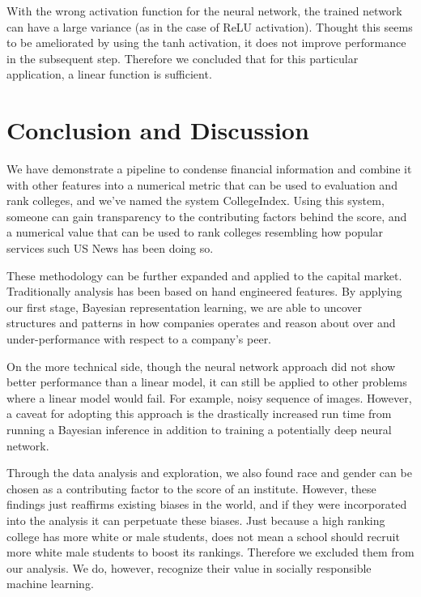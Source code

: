\documentclass[11pt,letter]{article}
\begin{document}
With the wrong activation function for the neural network, the trained network can have a large variance (as in the case of ReLU activation). Thought this seems to be ameliorated by using the tanh activation, it does not improve performance in the subsequent step. Therefore we concluded that for this particular application, a linear function is sufficient. 

\section{Conclusion and Discussion}
We have demonstrate a pipeline to condense financial information and combine it with other features into a numerical metric that can be used to evaluation and rank colleges, and we've named the system CollegeIndex. Using this system, someone can gain transparency to the contributing factors behind the score, and a numerical value that can be used to rank colleges resembling how popular services such US News has been doing so. 

These methodology can be further expanded and applied to the capital market. Traditionally analysis has been based on hand engineered features. By applying our first stage, Bayesian representation learning, we are able to uncover structures and patterns in how companies operates and reason about over and under-performance with respect to a company's peer. 

On the more technical side, though the neural network approach did not show better performance than a linear model, it can still be applied to other problems where a linear model would fail. For example, noisy sequence of images. However, a caveat for adopting this approach is the drastically increased run time from running a Bayesian inference in addition to training a potentially deep neural network. 

Through the data analysis and exploration, we also found race and gender can be chosen as a contributing factor to the score of an institute. However, these findings just reaffirms existing biases in the world, and if they were incorporated into the analysis it can perpetuate these biases. Just because a high ranking college has more white or male students, does not mean a school should recruit more white male students to boost its rankings. Therefore we excluded them from our analysis. We do, however, recognize their value in socially responsible machine learning.


\end{document}
